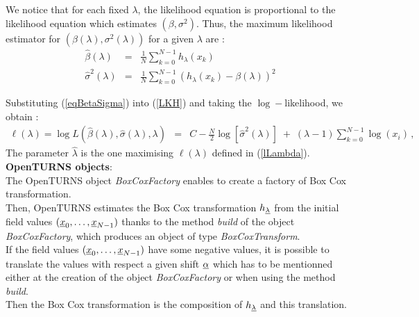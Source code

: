 We notice that for each fixed $\lambda$, the likelihood equation is proportional to the likelihood equation which estimates  $(\beta, \sigma^2)$.
Thus, the maximum likelihood estimator for $(\beta(\lambda), \sigma^2(\lambda))$ for a given $\lambda$  are :
\begin{eqnarray}\label{eqBetaSigma}
  \hat{\beta}(\lambda) & = & \frac{1}{N} \sum_{k=0}^{N-1} h_{\lambda}(x_k) \\
  \hat{\sigma}^2(\lambda)  & = &  \frac{1}{N} \sum_{k=0}^{N-1} (h_{\lambda}(x_k) - \beta(\lambda))^2
\end{eqnarray}

Substituting (\ref{eqBetaSigma}) into (\ref{LKH}) and taking the $\log-$likelihood, we obtain :
\begin{eqnarray}\label{lLambda}
  \ell(\lambda) = \log L( \hat{\beta}(\lambda), \hat{\sigma}(\lambda),\lambda ) & = & C -
  \frac{N}{2}
  \log\left[\hat{\sigma}^2(\lambda)\right]
  \;+\;
  \left(\lambda - 1 \right) \sum_{k=0}^{N-1} \log(x_i)\,,%
\end{eqnarray}
The parameter $\hat{\lambda}$ is the one maximising $\ell(\lambda)$ defined in (\ref{lLambda}).\\


{\bf OpenTURNS objects}:\\
The OpenTURNS object \emph{BoxCoxFactory} enables to create a factory of Box Cox transformation.\\

Then, OpenTURNS estimates the Box Cox transformation $h_{{\underline{\lambda}}}$ from  the initial field values $({\underline{x}}_0, \dots, {\underline{x}}_{N-1})$ thanks to the method \emph{build} of the object \emph{BoxCoxFactory}, which produces an object of type \emph{BoxCoxTransform}. \\

If the field values  $({\underline{x}}_0, \dots, {\underline{x}}_{N-1})$ have some negative values, it is possible to translate the values with respect a given shift ${\underline{\alpha}}$ which has to be mentionned either at the creation of the object {\itshape BoxCoxFactory} or when using the method \emph{build}.\\
Then the  Box Cox transformation is the composition of $h_{{\underline{\lambda}}}$  and this translation. \\


